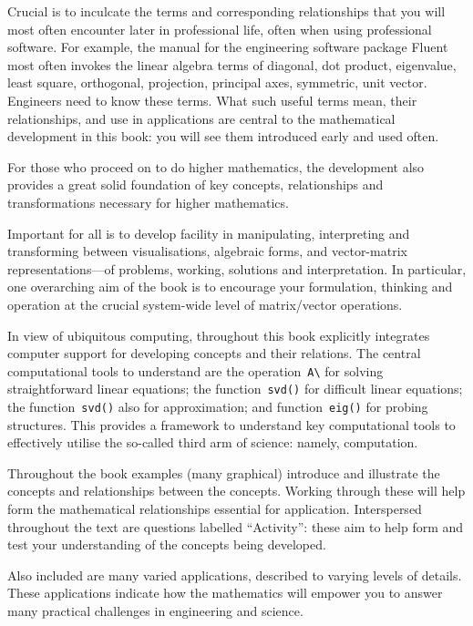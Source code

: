 Crucial is to inculcate the terms and corresponding relationships that you will most often encounter later in professional life, often when using professional software.  
For example, the manual for the engineering software package Fluent most often invokes the linear algebra terms of diagonal, dot product, eigenvalue, least square, orthogonal, projection, principal axes, symmetric, unit vector.
Engineers need to know these terms.
What such useful terms mean, their relationships, and use in applications are central to the mathematical development in this book: you will see them introduced early and used often.

For those who proceed on to do higher mathematics, the development also provides a great solid foundation of key concepts, relationships and transformations necessary for higher mathematics. 

Important for all is to develop facility in manipulating, interpreting and transforming between visualisations, algebraic forms, and vector-matrix representations---of problems, working, solutions and interpretation.
In particular, one overarching aim of the book is to encourage your formulation, thinking and operation at the crucial system-wide level of matrix\slash vector operations.

In view of ubiquitous computing, throughout this book explicitly integrates computer support for developing concepts and their relations.
The central computational tools to understand are the operation~\verb|A\| for solving straightforward linear equations; the function~\verb|svd()| for difficult linear equations; the function~\verb|svd()| also for approximation; and function~\verb|eig()| for probing structures.
This provides a framework to understand key computational tools to effectively utilise the so-called third arm of science: namely, computation. 

Throughout the book examples (many graphical) introduce and illustrate the concepts and relationships between the concepts.
Working through these will help form the mathematical relationships essential for application.
Interspersed throughout the text are questions labelled ``Activity'': these aim to help form and test your understanding of the concepts being developed.

Also included are many varied applications, described to varying levels of details.
These applications indicate how the mathematics will empower you to answer many practical challenges in engineering and science.


